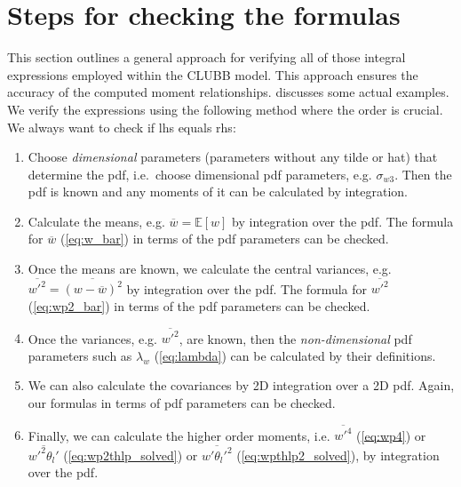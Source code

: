 \section{Steps for checking the formulas}\label{sec:steps_for_checking}

This section outlines a general approach for verifying all of those integral expressions
employed within the \gls{CLUBB} model.
This approach ensures the accuracy of the computed moment relationships.
 discusses some actual examples.
We verify the expressions using the following method where the order is crucial.
We always want to check if \gls{lhs} equals \gls{rhs}:

\begin{enumerate}
    \item\label{itm:checkingstep_1}
    Choose \emph{dimensional} parameters (parameters without any tilde or hat) that determine the \gls{pdf},
    i.e.\ choose dimensional \gls{pdf} parameters, e.g. $\sigma_{w 3}$.
    Then the \gls{pdf} is known and any moments of it can be calculated by integration.

    \item\label{itm:checkingstep_2}
    Calculate the means, e.g. $\overline{w} = \mathbb{E}[w]$ by integration over the \gls{pdf}.
    The formula for $\overline{w}$ (\cref{eq:w_bar}) in terms of the \gls{pdf} parameters can be checked.

    \item\label{itm:checkingstep_3}
    Once the means are known, we calculate the central variances,
    e.g.  $\overline{w'^2} = \overline{(w-\overline{w})^2}$ by integration over the \gls{pdf}.
    The formula for $\overline{w'^2}$ (\cref{eq:wp2_bar}) in terms of the \gls{pdf} parameters can be checked.

    \item\label{itm:checkingstep_4}
    Once the variances, e.g. $\overline{w'^2}$, are known,
    then the \emph{non-dimensional} \gls{pdf} parameters such as $\lambda_w$ (\cref{eq:lambda})
    can be calculated by their definitions.

    \item\label{itm:checkingstep_5}
    We can also calculate the covariances by 2D integration over a 2D \gls{pdf}.
    Again, our formulas in terms of \gls{pdf} parameters can be checked.

    \item\label{itm:checkingstep_6}
    Finally, we can calculate the higher order moments,
    i.e. $\overline{w'^4}$ (\cref{eq:wp4}) or $\overline{w'^2 \theta_l'}$ (\cref{eq:wp2thlp_solved})
    or $\overline{w' \theta_l'^2}$ (\cref{eq:wpthlp2_solved}),
    by integration over the \gls{pdf}.


\end{enumerate}

